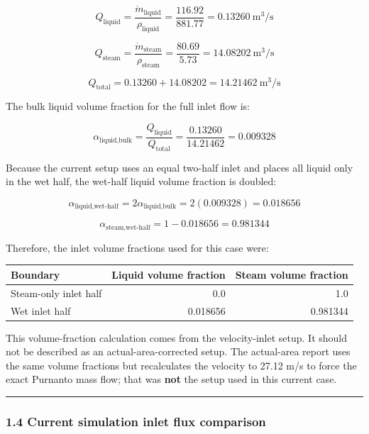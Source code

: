 \documentclass[
  11pt,
]{article}
\newcounter{none} %
\begin{document}
\[
Q_{\text{liquid}}
=
\frac{\dot{m}_{\text{liquid}}}{\rho_{\text{liquid}}}
=
\frac{116.92}{881.77}
=
0.13260\ \text{m}^3/\text{s}
\]

\[
Q_{\text{steam}}
=
\frac{\dot{m}_{\text{steam}}}{\rho_{\text{steam}}}
=
\frac{80.69}{5.73}
=
14.08202\ \text{m}^3/\text{s}
\]

\[
Q_{\text{total}}
=
0.13260 + 14.08202
=
14.21462\ \text{m}^3/\text{s}
\]

The bulk liquid volume fraction for the full inlet flow is:

\[
\alpha_{\text{liquid,bulk}}
=
\frac{Q_{\text{liquid}}}{Q_{\text{total}}}
=
\frac{0.13260}{14.21462}
=
0.009328
\]

Because the current setup uses an equal two-half inlet and places all
liquid only in the wet half, the wet-half liquid volume fraction is
doubled:

\[
\alpha_{\text{liquid,wet-half}}
=
2\alpha_{\text{liquid,bulk}}
=
2(0.009328)
=
0.018656
\]

\[
\alpha_{\text{steam,wet-half}}
=
1 - 0.018656
=
0.981344
\]

Therefore, the inlet volume fractions used for this case were:

{\def\LTcaptype{none} %
\begin{longtable}[]{@{}lrr@{}}
\toprule\noalign{}
Boundary & Liquid volume fraction & Steam volume fraction \\
\midrule\noalign{}
\endhead
\bottomrule\noalign{}
\endlastfoot
Steam-only inlet half & 0.0 & 1.0 \\
Wet inlet half & 0.018656 & 0.981344 \\
\end{longtable}
}

This volume-fraction calculation comes from the velocity-inlet setup. It
should not be described as an actual-area-corrected setup. The
actual-area report uses the same volume fractions but recalculates the
velocity to 27.12 m/s to force the exact Purnanto mass flow; that was
\textbf{not} the setup used in this current case.

\begin{center}\rule{0.5\linewidth}{0.5pt}\end{center}

\subsubsection{1.4 Current simulation inlet flux
comparison}\label{current-simulation-inlet-flux-comparison}
\end{document}
